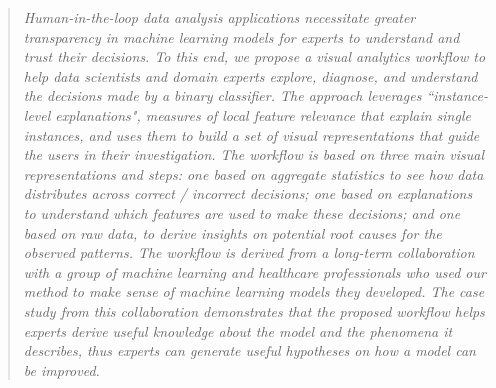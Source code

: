 \begin{quote}\textit{
Human-in-the-loop data analysis applications necessitate greater transparency in machine learning models for experts to understand and trust their decisions. To this end,   
we propose a visual analytics workflow to help data scientists and domain experts explore, diagnose, and understand the decisions made by a binary classifier.
The approach leverages ``instance-level explanations", measures of local feature relevance that explain single instances, and uses them to build a set of visual representations that guide the users in their investigation.
The workflow is based on three main visual representations and steps:
one based on aggregate statistics to see how data distributes across correct / incorrect decisions;
one based on explanations to understand which features are used to make these decisions;
and one based on raw data, to derive insights on potential root causes for the observed patterns.
The workflow is derived from a long-term collaboration with a group of machine learning and healthcare professionals who used our method to make sense of machine learning models they developed.
The case study from this collaboration demonstrates that the proposed workflow helps experts derive useful knowledge about the model and the phenomena it describes, thus experts can generate useful hypotheses on how a model can be improved.
}\end{quote}


